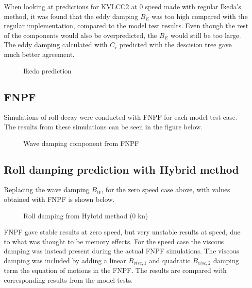     When looking at predictions for KVLCC2 at 0 speed made with regular
Ikeda's method, it was found that the eddy damping \(B_E\) was too high
compared with the regular implementation, compared to the model test
results. Even though the rest of the components would also be
overpredicted, the \(B_E\) would still be too large. The eddy damping
calculated with \(C_r\) predicted with the descision tree gave much
better agreement.

    \begin{figure}
        \begin{center}\end{center}
        \caption{Ikeda prediction}
        \label{fig:ikeda}
    \end{figure}
    
    \subsection{FNPF}\label{fnpf}

Simulations of roll decay were conducted with FNPF for each model
test case. The results from these simulations can be seen in the figure
below.

    \begin{figure}
        \begin{center}\end{center}
        \caption{Wave damping component from FNPF}
        \label{fig:fnpf}
    \end{figure}
    
    \subsection{Roll damping prediction with Hybrid
method}\label{roll-damping-prediction-with-hybrid-method}
Replacing the wave damping $B_W$, for the zero speed case above, with values obtained with FNPF is shown below. 
    \begin{figure}
        \begin{center}\end{center}
        \caption{Roll damping from Hybrid method (0 kn)}
        \label{fig:hybrid_0}
    \end{figure}
    
    FNPF gave stable results at zero speed, but very unstable results at
speed, due to what was thought to be memory effects. For the speed case
the viscous damping was instead present during the actual FNPF
simulations. The viscous damping was included by adding a linear
\(B_{visc,1}\) and quadratic \(B_{visc,2}\) damping term the equation of
motions in the FNPF. The results are compared with corresponding results
from the model tests.

